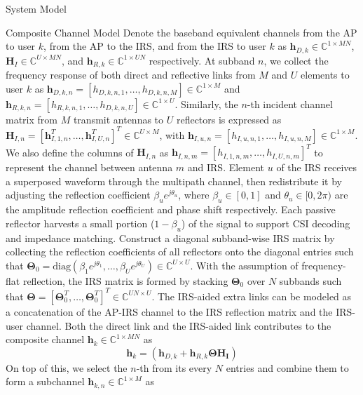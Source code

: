 \documentclass{IEEEtran}
\begin{document}
\begin{section} {System Model}
\begin{subsection}	{Composite Channel Model}
		Denote the baseband equivalent channels from the AP to user $k$, from the AP to the IRS, and from the IRS to user $k$ as $\boldsymbol{h}_{D,k} \in \mathbb{C}^{1 \times MN}$, $\boldsymbol{H}_I \in \mathbb{C}^{U \times MN}$, and $\boldsymbol{h}_{R,k} \in \mathbb{C}^{1 \times UN}$ respectively. At subband $n$, we collect the frequency response of both direct and reflective links from $M$ and $U$ elements to user $k$ as $\boldsymbol{h}_{D,k,n}=[h_{D,k,n,1},\dots,h_{D,k,n,M}] \in \mathbb{C}^{1 \times M}$ and $\boldsymbol{h}_{R,k,n}=[h_{R,k,n,1},\dots,h_{D,k,n,U}] \in \mathbb{C}^{1 \times U}$. Similarly, the $n$-th incident channel matrix from $M$ transmit antennas to $U$ reflectors is expressed as $\boldsymbol{H}_{I,n}=[\boldsymbol{h}_{I,1,n}^T,\dots,\boldsymbol{h}_{I,U,n}^T]^T \in \mathbb{C}^{U \times M}$, with $\boldsymbol{h}_{I,u,n}=[h_{I,u,n,1},\dots,h_{I,u,n,M}] \in \mathbb{C}^{1 \times M}$. We also define the columns of $\boldsymbol{H}_{I,n}$ as $\boldsymbol{h}_{I,n,m}=[h_{I,1,n,m},\dots,h_{I,U,n,m}]^T$ to represent the channel between antenna $m$ and IRS. Element $u$ of the IRS receives a superposed waveform through the multipath channel, then redistribute it by adjusting the reflection coefficient $\beta_u e^{j \theta_u}$, where $\beta_u \in [0,1]$ and $\theta_u \in [0,2\pi)$ are the amplitude reflection coefficient and phase shift respectively. Each passive reflector harvests a small portion ($1 - \beta_u$) of the signal to support CSI decoding and impedance matching. Construct a diagonal subband-wise IRS matrix by collecting the reflection coefficients of all reflectors onto the diagonal entries such that $\boldsymbol{\Theta}_0 = \text{diag}(\beta_1 e^{j \theta_1}, \dots, \beta_U e^{j \theta_U}) \in \mathbb{C}^{U \times U}$. With the assumption of frequency-flat reflection, the IRS matrix is formed by stacking $\boldsymbol{\Theta}_0$ over $N$ subbands such that $\boldsymbol{\Theta} = [\boldsymbol{\Theta}_0^T,\dots,\boldsymbol{\Theta}_0^T]^T \in \mathbb{C}^{UN \times U}$. The IRS-aided extra links can be modeled as a concatenation of the AP-IRS channel to the IRS reflection matrix and the IRS-user channel. Both the direct link and the IRS-aided link contributes to the composite channel $\boldsymbol{h}_k \in \mathbb{C}^{1 \times MN}$ as
		\begin{equation}	\label{eq:h_k}
			\boldsymbol{h}_k = \left( \boldsymbol{h}_{D,k}+\boldsymbol{h}_{R,k} \boldsymbol{\Theta} \boldsymbol{\boldsymbol{H}_I} \right)
		\end{equation}
		On top of this, we select the $n$-th from its every $N$ entries and combine them to form a subchannel $\boldsymbol{h}_{k,n} \in \mathbb{C}^{1 \times M}$ as

\end{subsection}
\end{section}
\end{document}
